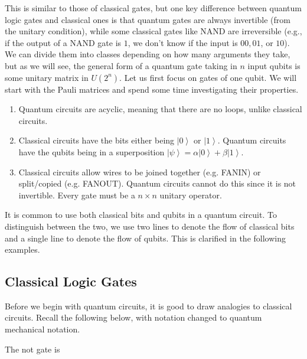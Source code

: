 \documentclass{article}
\newcommand{\ket}[1]{\ensuremath{\left|#1\right\rangle}}
\begin{document}
    This is similar to those of classical gates, but one key difference between quantum logic gates and classical ones is that quantum gates are always invertible (from the unitary condition), while some classical gates like NAND are irreversible (e.g., if the output of a NAND gate is $1$, we don't know if the input is $00, 01$, or $10$). We can divide them into classes depending on how many arguments they take, but as we will see, the general form of a quantum gate taking in $n$ input qubits is some unitary matrix in $U(2^n)$. Let us first focus on gates of one qubit. We will start with the Pauli matrices and spend some time investigating their properties.  

    \begin{enumerate} 
      \item Quantum circuits are acyclic, meaning that there are no loops, unlike classical circuits. 
      \item Classical circuits have the bits either being $\ket{0}$ or $\ket{1}$. Quantum circuits have the qubits being in a superposition $\ket{\psi} = \alpha \ket{0} + \beta \ket{1}$. 
      \item Classical circuits allow wires to be joined together (e.g. FANIN) or split/copied (e.g. FANOUT). Quantum circuits cannot do this since it is not invertible. Every gate must be a $n \times n$ unitary operator.
    \end{enumerate}
    
    It is common to use both classical bits and qubits in a quantum circuit. To distinguish between the two, we use two lines to denote the flow of classical bits and a single line to denote the flow of qubits. This is clarified in the following examples. 

  \subsection{Classical Logic Gates} 

    Before we begin with quantum circuits, it is good to draw analogies to classical circuits. Recall the following below, with notation changed to quantum mechanical notation. 

    \begin{definition}
      The not gate is 
    \end{definition}

    \begin{definition}
      
    \end{definition}
\end{document}
